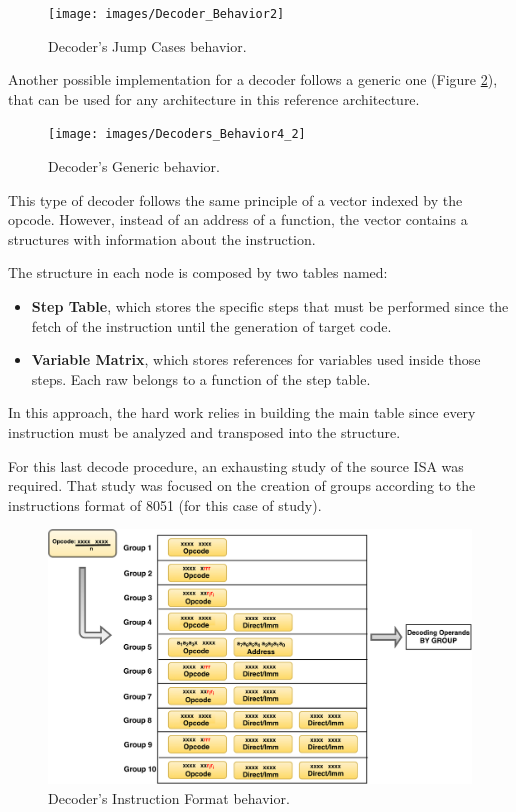 \begin{figure}[
H]
\centerline{
\texttt{[image: images/Decoder\_Behavior2]}
}
\caption{Decoder's Jump Cases behavior.}
\label{fig:Decoders_Behavior2} 
\end{figure}



Another possible implementation for a decoder follows a generic one (Figure \ref{fig:Decoders_Behavior4}), that can be used for any architecture in this reference architecture.  


\begin{figure}[!htb]
\centerline{
\texttt{[image: images/Decoders\_Behavior4\_2]}
}
\caption{Decoder's Generic behavior.}
\label{fig:Decoders_Behavior4} 
\end{figure}

This type of decoder follows the same principle of a vector indexed by the opcode. However, instead of an address of a function, the vector contains a structures with information about the instruction. 

The structure in each node is composed by two tables named:
\begin{itemize}
\item \textbf{Step Table}, which stores the specific steps that must be performed since the fetch of the instruction until the generation of target code.
\item \textbf{Variable Matrix}, which stores references for variables used inside those steps. Each raw belongs to a function of the step table.
\end{itemize}

In this approach, the hard work relies in building the main table since every instruction must be analyzed and transposed into the structure.  


    For this last decode procedure, an exhausting study of the source ISA was required. That study was focused on the creation of groups according to the instructions format of 8051 (for this case of study).
    
   
    \begin{figure}[!htb]
    \centerline{
    \includegraphics[scale=0.4]{images/Decoders_Behaviors3}
    }
    \caption{Decoder's Instruction Format behavior.}
    \label{fig:Decoders_Behavior3} 
    \end{figure}
	
